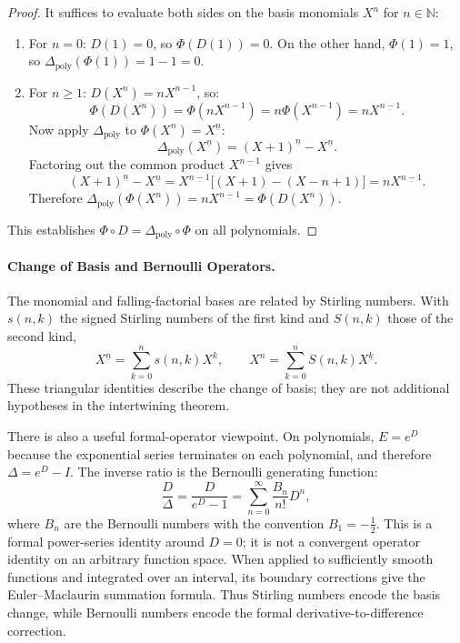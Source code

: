 \begin{proof}
It suffices to evaluate both sides on the basis monomials $X^n$ for $n \in \mathbb{N}$:
\begin{enumerate}
    \item For $n = 0$: $D(1) = 0$, so $\Phi(D(1)) = 0$. On the other hand, $\Phi(1) = 1$, so $\Delta_{\mathrm{poly}}(\Phi(1)) = 1 - 1 = 0$.
    \item For $n \ge 1$: $D(X^n) = n X^{n-1}$, so:
    \begin{equation}
    \Phi(D(X^n)) = \Phi(n X^{n-1}) = n \Phi(X^{n-1}) = n X^{\underline{n-1}}.
    \end{equation}
    Now apply $\Delta_{\mathrm{poly}}$ to $\Phi(X^n) = X^{\underline{n}}$:
    \begin{equation}
    \Delta_{\mathrm{poly}}(X^{\underline{n}}) = (X+1)^{\underline{n}} - X^{\underline{n}}.
    \end{equation}
    Factoring out the common product $X^{\underline{n-1}}$ gives
    \begin{equation}
    (X+1)^{\underline{n}}-X^{\underline{n}}
    =X^{\underline{n-1}}\bigl[(X+1)-(X-n+1)\bigr]
    =nX^{\underline{n-1}}.
    \end{equation}
    Therefore $\Delta_{\mathrm{poly}}(\Phi(X^n)) = n X^{\underline{n-1}} = \Phi(D(X^n))$.
\end{enumerate}
This establishes $\Phi \circ D = \Delta_{\mathrm{poly}} \circ \Phi$ on all polynomials.
\end{proof}

\paragraph{Change of Basis and Bernoulli Operators.}
The monomial and falling-factorial bases are related by Stirling numbers. With
$s(n,k)$ the signed Stirling numbers of the first kind and $S(n,k)$ those of
the second kind,
\begin{equation}
X^{\underline n}=\sum_{k=0}^n s(n,k)X^k,
\qquad
X^n=\sum_{k=0}^n S(n,k)X^{\underline k}.
\end{equation}
These triangular identities describe the change of basis; they are not
additional hypotheses in the intertwining theorem.

There is also a useful formal-operator viewpoint. On polynomials,
$E=e^D$ because the exponential series terminates on each polynomial, and
therefore $\Delta=e^D-I$. The inverse ratio is the Bernoulli generating
function:
\begin{equation}
\frac{D}{\Delta}=\frac{D}{e^D-1}
=\sum_{n=0}^{\infty}\frac{B_n}{n!}D^n,
\end{equation}
where $B_n$ are the Bernoulli numbers with the convention
$B_1=-\tfrac12$. This is a formal power-series identity around $D=0$; it is
not a convergent operator identity on an arbitrary function space. When
applied to sufficiently smooth functions and integrated over an interval, its
boundary corrections give the Euler--Maclaurin summation formula. Thus Stirling
numbers encode the basis change, while Bernoulli numbers encode the formal
derivative-to-difference correction.

